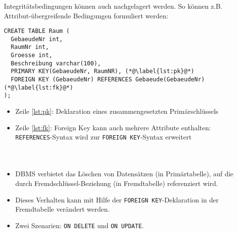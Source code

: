 \begin{frame}[fragile]\frametitle{\insertsection}
	\framesubtitle{\insertsubsection}
	Integritätsbedingungen können auch nachgelagert werden. 
	\nl
	So können z.B. Attribut-übergreifende Bedingungen formuliert werden:
		\begin{lstlisting}[xleftmargin=3ex]
CREATE TABLE Raum (
  GebaeudeNr int,
  RaumNr int,
  Groesse int,
  Beschreibung varchar(100),
  PRIMARY KEY(GebaeudeNr, RaumNR), (*@\label{lst:pk}@*)
  FOREIGN KEY (GebaeudeNr) REFERENCES Gebaeude(GebaeudeNr) (*@\label{lst:fk}@*)
);
		\end{lstlisting}
\abs
\begin{itemize}
	\item Zeile \ref{lst:pk}: Deklaration eines zusammengesetzten Primärschlüssels
	\item Zeile \ref{lst:fk}: Foreign Key kann auch mehrere Attribute enthalten: \texttt{REFERENCES}-Syntax wird zur
	\texttt{FOREIGN KEY}-Syntax erweitert
\end{itemize}	
\end{frame}

\begin{frame}[fragile]\frametitle{\insertsection}
\framesubtitle{\insertsubsection}
\\[4pt]
\begin{itemize}
	\item DBMS verbietet das Löschen von Datensätzen (in Prim\"artabelle), 
	auf die durch Fremdschlüssel-Beziehung (in Fremdtabelle) 
	referenziert wird.
	\item	Dieses Verhalten kann mit Hilfe der \texttt{FOREIGN KEY}-Deklaration in der Fremdtabelle
	ver\"andert werden.
	\item Zwei Szenarien: \texttt{ON DELETE} und \texttt{ON UPDATE}. 
\end{itemize}
\end{frame}

